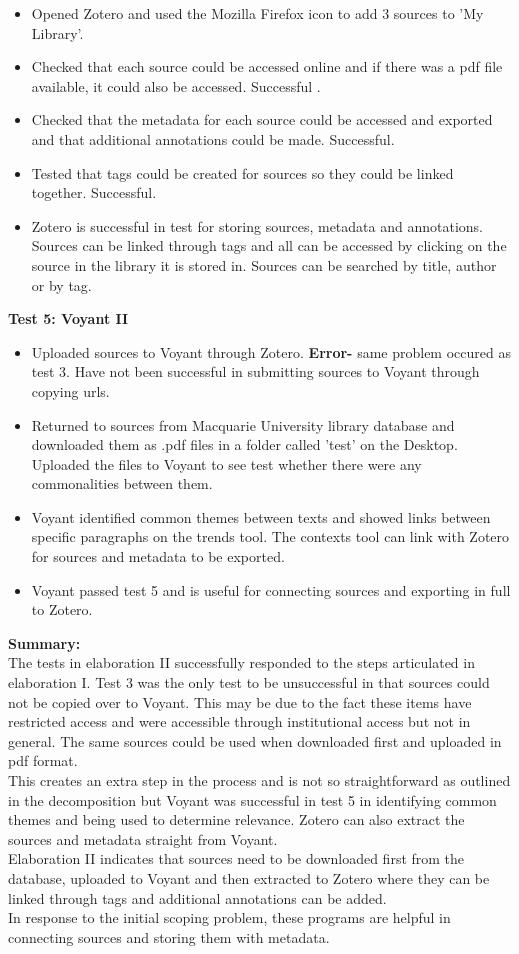 \documentclass{article}
\begin{document}
\begin{itemize}
    \item Opened Zotero and used the Mozilla Firefox icon to add 3 sources to 'My Library'.
    \item Checked that each source could be accessed online and if there was a pdf file available, it could also be accessed. Successful .
    \item Checked that the metadata for each source could be accessed and exported and that additional annotations could be made. Successful.
    \item Tested that tags could be created for sources so they could be linked together. Successful.
    \item Zotero is successful in test for storing sources, metadata and annotations. Sources can be linked through tags and all can be accessed by clicking on the source in the library it is stored in. Sources can be searched by title, author or by tag.
    \end{itemize}
\textbf{Test 5: Voyant II}
\begin{itemize}
    \item Uploaded sources to Voyant through Zotero. \textbf{Error-} same problem occured as test 3. Have not been successful in submitting sources to Voyant through copying urls. 
    \item Returned to sources from Macquarie University library database and downloaded them as .pdf files in a folder called 'test' on the Desktop. Uploaded the files to Voyant to see test whether there were any commonalities between them.
    \item Voyant identified common themes between texts and showed links between specific paragraphs on the trends tool. The contexts tool can link with Zotero for sources and metadata to be exported.
    \item Voyant passed test 5 and is useful for connecting sources and exporting in full to Zotero. 
\end{itemize}
\textbf{Summary:}\\
The tests in elaboration II successfully responded to the steps articulated in elaboration I. Test 3 was the only test to be unsuccessful in that sources could not be copied over to Voyant. This may be due to the fact these items have restricted access and were accessible through institutional access but not in general. The same sources could be used when downloaded first and uploaded in pdf format. \\
This creates an extra step in the process and is not so straightforward as outlined in the decomposition but Voyant was successful in test 5 in identifying common themes and being used to determine relevance. Zotero can also extract the sources and metadata straight from Voyant.\\
Elaboration II indicates that sources need to be downloaded first from the database, uploaded to Voyant and then extracted to Zotero where they can be linked through tags and additional annotations can be added. \\
In response to the initial scoping problem, these programs are helpful in connecting sources and storing them with metadata. 
\end{document}
